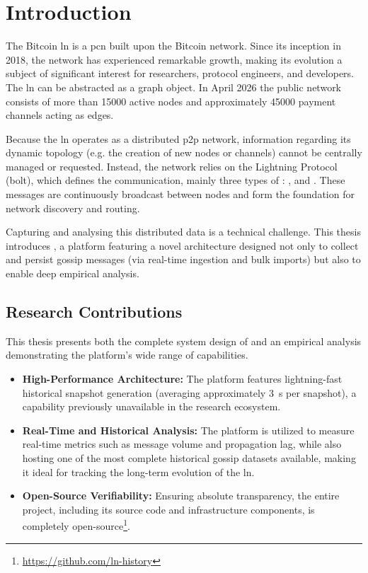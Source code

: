 \chapter{Introduction}
\label{ch:introduction}

The Bitcoin \gls{ln} is a \gls{pcn} built upon the Bitcoin network. 
Since its inception in 2018, the network has experienced remarkable growth, making its evolution a subject 
of significant interest for researchers, protocol engineers, and developers. 
The \gls{ln} can be abstracted as a graph object. 
In April 2026 the public network consists of more than
\num{15000} active nodes and approximately \num{45000} payment channels acting as edges.

Because the \gls{ln} operates as a distributed \gls{p2p} network, 
information regarding its dynamic topology (e.g. the creation of new nodes or channels)
cannot be centrally managed or requested. 
Instead, the network relies on the Lightning Protocol (\gls{bolt}), which defines 
the communication, mainly three types of : ,  and . 
These messages are continuously broadcast between nodes and form the foundation for network discovery and routing.

Capturing and analysing this distributed data is a technical challenge. 
This thesis introduces , a platform featuring a novel architecture designed 
not only to collect and persist gossip messages (via real-time ingestion and bulk imports) 
but also to enable deep empirical analysis.


\section{Research Contributions}
This thesis presents both the complete system design of  and 
an empirical analysis demonstrating the platform's wide range of capabilities.
\begin{itemize}
    \item \textbf{High-Performance Architecture:} 
        The platform features lightning-fast historical snapshot generation (averaging approximately \qty{3}{\second} per snapshot), 
        a capability previously unavailable in the research ecosystem.
    \item \textbf{Real-Time and Historical Analysis:} 
        The platform is utilized to measure real-time metrics such as message volume and propagation lag, 
        while also hosting one of the most complete historical gossip datasets available, 
        making it ideal for tracking the long-term evolution of the \gls{ln}.
    \item \textbf{Open-Source Verifiability:} 
        Ensuring absolute transparency, the entire project, including its source code and infrastructure components, 
        is completely open-source\footnote{\url{https://github.com/ln-history}}.
\end{itemize}


